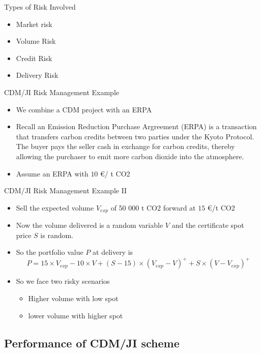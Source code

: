 {Types of Risk Involved}
\begin{itemize}
\item<1-> Market risk
\item<2-> Volume Risk
\item<3-> Credit Risk
\item<4-> Delivery Risk
\end{itemize}



{CDM/JI Risk Management Example}
\begin{itemize}
\item<1-> We combine a CDM project with an ERPA
\item<2-> Recall an Emission Reduction Purchase Argreement (ERPA) is a  transaction that transfers carbon credits between two parties under the Kyoto Protocol. The buyer pays the seller cash in exchange for carbon credits, thereby allowing the purchaser to emit more carbon dioxide into the atmosphere.
\item<3-> Assume an ERPA with $10$ \euro/ t CO2
\end{itemize}



{CDM/JI Risk Management Example II}
\begin{itemize}
\item<1-> Sell the expected volume $V_{exp}$ of 50 000 t CO2 forward at $15$ \euro /t CO2
\item<2-> Now the volume delivered is a random variable $V$ and the certificate spot price $S$ is random.
\item<3-> So the portfolio value $P$ at delivery is
\begin{equation}\nonumber
P = 15 \times V_{exp} - 10 \times V + (S-15) \times (V_{exp}-V)^+ + S \times (V-V_{exp})^+
\end{equation}
\item<4-> So we face two risky scenarios
\begin{itemize}
\item Higher volume with low spot
\item lower volume with higher spot
\end{itemize}
\end{itemize}



\subsection{Performance of CDM/JI scheme}


